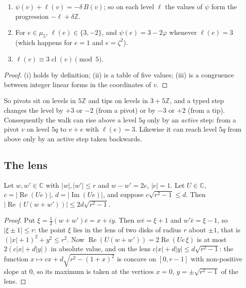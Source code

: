 \documentclass[11pt,a4paper]{article}
\newcommand{\C}{\mathbb{C}}
\newcommand{\Z}{\mathbb{Z}}
\newcommand{\cls}{\operatorname{cl}}
\newcommand{\re}{\operatorname{Re}}
\newcommand{\im}{\operatorname{Im}}
\begin{document}
\begin{lemma}\label{lem:level}
\begin{enumerate}[label=(\roman*),nosep]
  \item $\psi(v)+\ell(v)=-\delta\,B(v)$; so on each level $\ell$ the values of $\psi$ form the
        progression $-\ell+\delta\Z$.
  \item For $e\in\mu_5$, $\ell(e)\in\{3,-2\}$, and $\psi(e)=3-2\varphi$ whenever $\ell(e)=3$ (which
        happens for $e=1$ and $e=\zeta^2$).
  \item $\ell(v)\equiv 3\cls(v)\pmod 5$.
\end{enumerate}
\end{lemma}

\begin{proof}
(i) holds by definition; (ii) is a table of five values; (iii) is a congruence between integer
linear forms in the coordinates of $v$.
\end{proof}

So pivots sit on levels in $5\Z$ and tips on levels in $3+5\Z$, and a typed step changes the level
by $+3$ or $-2$ (from a pivot) or by $-3$ or $+2$ (from a tip). Consequently the walk can rise above
a level $5q$ only by an \emph{active} step: from a pivot $v$ on level $5q$ to $v+e$ with $\ell(e)=3$.
Likewise it can reach level $5q$ from above only by an active step taken backwards.

\subsection{The lens}

\begin{lemma}\label{lem:lens}
Let $w,w'\in\C$ with $|w|,|w'|\le r$ and $w-w'=2e$, $|e|=1$. Let $U\in\C$, $c=|\re(Ue)|$,
$d=|\im(Ue)|$, and suppose $c\sqrt{r^2-1}\le d$. Then $|\re(U(w+w'))|\le 2d\sqrt{r^2-1}$.
\end{lemma}

\begin{proof}
Put $\xi=\tfrac12(w+w')\bar e=x+iy$. Then $w\bar e=\xi+1$ and $w'\bar e=\xi-1$, so $|\xi\pm1|\le r$:
the point $\xi$ lies in the lens of two disks of radius $r$ about $\pm1$, that is
$(|x|+1)^2+y^2\le r^2$. Now $\re(U(w+w'))=2\re(Ue\,\xi)$ is at most $2(c|x|+d|y|)$ in absolute
value, and on the lens $c|x|+d|y|\le d\sqrt{r^2-1}$: the function
$x\mapsto cx+d\sqrt{r^2-(1+x)^2}$ is concave on $[0,r-1]$ with non-positive slope at $0$, so its
maximum is taken at the vertices $x=0$, $y=\pm\sqrt{r^2-1}$ of the lens.
\end{proof}
\end{document}
